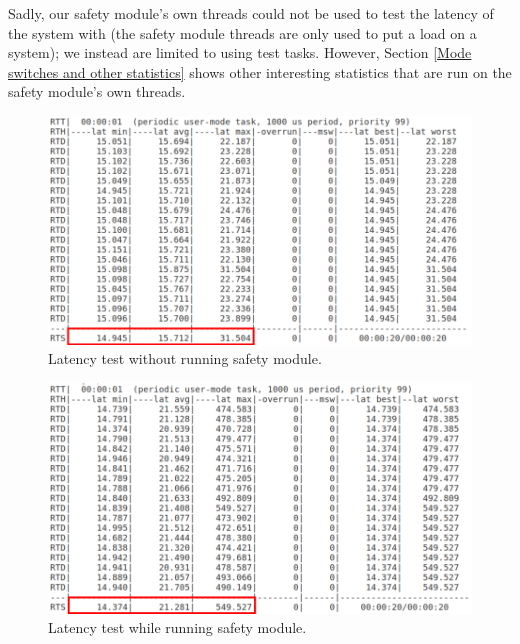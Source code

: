 \documentclass[12pt]{scrreprt}
\begin{document}
\par
Sadly, our safety module's own threads could not be used to test the latency of the system with (the safety module threads are only used to put a load on a system); we instead are limited to using test tasks. However, Section \ref{Mode switches and other statistics} shows other interesting statistics that are run on the safety module's own threads.

\begin{figure}[H]
    \centering
    \includegraphics[width=\textwidth]{Figures/results/stat/latency_with_frame_no_sm.png}
    \caption{Latency test without running safety module.}
    \label{fig:lat_without_sm}
\end{figure}


\begin{figure}[H]
    \centering
    \includegraphics[width=\textwidth]{Figures/results/stat/latency_with_frame_sm.png}
    \caption{Latency test while running safety module.}
    \label{fig:lat_with_sm}
\end{figure}


\end{document}
